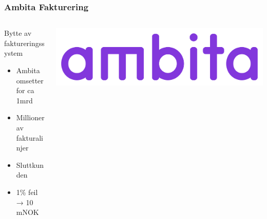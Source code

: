 \documentclass{beamer}
\begin{document}
    \begin{frame}
        \frametitle{Ambita Fakturering}
        \begin{columns}[c]
            \begin{column}{.55\textwidth}
                \begin{block}{Bytte av faktureringssystem}
                    \begin{itemize}
                        \item Ambita omsetter for ca 1mrd
                        \item Millioner av fakturalinjer
                        \item Sluttkunden
                        \item 1\% feil → 10 mNOK
                    \end{itemize}
                \end{block}
            \end{column}
            \begin{column}{.45\textwidth}
                \begin{center}
                    \includegraphics[width=\textwidth]{images/altibox-logo}
                \end{center}
            \end{column}
        \end{columns}
    \end{frame}
\end{document}

